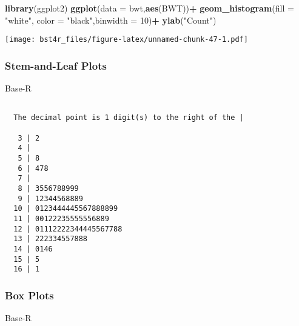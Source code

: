 \documentclass[12pt,]{article}
\newenvironment{Shaded}{\begin{snugshade}}{\end{snugshade}}
\newcommand{\DataTypeTok}[1]{\textcolor[rgb]{0.13,0.29,0.53}{#1}}
\newcommand{\DecValTok}[1]{\textcolor[rgb]{0.00,0.00,0.81}{#1}}
\newcommand{\KeywordTok}[1]{\textcolor[rgb]{0.13,0.29,0.53}{\textbf{#1}}}
\newcommand{\NormalTok}[1]{#1}
\newcommand{\OperatorTok}[1]{\textcolor[rgb]{0.81,0.36,0.00}{\textbf{#1}}}
\newcommand{\StringTok}[1]{\textcolor[rgb]{0.31,0.60,0.02}{#1}}
\begin{document}
\begin{Shaded}
\begin{Highlighting}[]
\KeywordTok{library}\NormalTok{(ggplot2)}
 \KeywordTok{ggplot}\NormalTok{(}\DataTypeTok{data =}\NormalTok{ bwt,}\KeywordTok{aes}\NormalTok{(BWT))}\OperatorTok{+}
\StringTok{  }\KeywordTok{geom_histogram}\NormalTok{(}\DataTypeTok{fill =} \StringTok{"white"}\NormalTok{, }\DataTypeTok{color =} \StringTok{"black"}\NormalTok{,}\DataTypeTok{binwidth =} \DecValTok{10}\NormalTok{)}\OperatorTok{+}
\StringTok{  }\KeywordTok{ylab}\NormalTok{(}\StringTok{"Count"}\NormalTok{)}
\end{Highlighting}
\end{Shaded}

\texttt{[image: bst4r\_files/figure-latex/unnamed-chunk-47-1.pdf]}

\hypertarget{stem-and-leaf-plots}{%
\subsubsection{Stem-and-Leaf Plots}\label{stem-and-leaf-plots}}

Base-R

\begin{Shaded}
\end{Shaded}

\begin{verbatim}

  The decimal point is 1 digit(s) to the right of the |

   3 | 2
   4 | 
   5 | 8
   6 | 478
   7 | 
   8 | 3556788999
   9 | 12344568889
  10 | 0123444445567888899
  11 | 00122235555556889
  12 | 01112222344445567788
  13 | 222334557888
  14 | 0146
  15 | 5
  16 | 1
\end{verbatim}

\hypertarget{box-plots}{%
\subsubsection{Box Plots}\label{box-plots}}

Base-R

\begin{Shaded}
\end{Shaded}
\end{document}
